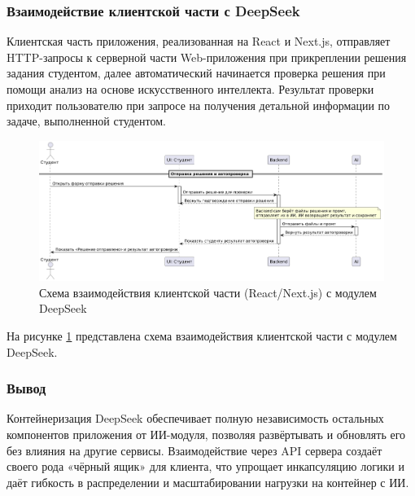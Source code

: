 \subsubsection{Взаимодействие клиентской части с DeepSeek}

Клиентская часть приложения, реализованная на React и Next.js, отправляет HTTP-запросы к серверной части Web-приложения при прикреплении решения задания студентом, далее автоматический начинается проверка решения при помощи анализ на основе искусственного интеллекта. Результат проверки приходит пользователю при запросе на получения детальной информации по задаче, выполненной студентом.

\begin{figure}[h]
    \centering
    \includegraphics[width=0.8\linewidth]{static/diagrams/TaskSendStudentDiagram.png}
    \caption{Схема взаимодействия клиентской части (React/Next.js) с модулем DeepSeek}
    \label{fig:client-deepseek}
\end{figure}

На рисунке \ref{fig:client-deepseek} представлена схема взаимодействия клиентской части с модулем DeepSeek.

\subsubsection{Вывод}

Контейнеризация DeepSeek обеспечивает полную независимость остальных компонентов приложения от ИИ-модуля, позволяя развёртывать и обновлять его без влияния на другие сервисы. Взаимодействие через API сервера создаёт своего рода «чёрный ящик» для клиента, что упрощает инкапсуляцию логики и даёт гибкость в распределении и масштабировании нагрузки на контейнер с ИИ.



